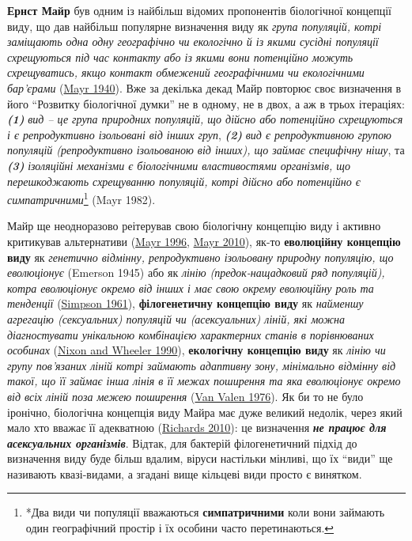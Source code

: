 \documentclass[
  11pt,
]{book}
\begin{document}
\textbf{Ернст Майр} був одним із найбільш відомих пропонентів біологічної концепції виду, що дав найбільш популярне визначення виду як \emph{група популяцій, котрі заміщають одна одну географічно чи екологічно й із якими сусідні популяції схрещуються під час контакту або із якими вони потенційно можуть схрещуватись, якщо контакт обмежений географічними чи екологічними бар'єрами} (\href{https://doi.org/10.1086/280892}{Mayr 1940}). Вже за декілька декад Майр повторює своє визначення в його ``Розвитку біологічної думки'' не в одному, не в двох, а аж в трьох ітераціях: \textbf{\emph{(1)}} \emph{вид -- це група природних популяцій, що дійсно або потенційно схрещуються і є репродуктивно ізольовані від інших груп}, \textbf{\emph{(2)}} \emph{вид є репродуктивною групою популяцій (репродуктивно ізольованою від інших), що займає специфічну нішу}, та \textbf{\emph{(3)}} \emph{ізоляційні механізми є біологічними властивостями організмів, що перешкоджають схрещуванню популяцій, котрі дійсно або потенційно є симпатричними}\footnote{*Два види чи популяції вважаються \textbf{симпатричними} коли вони займають один географічний простір і їх особини часто перетинаються.} (Mayr 1982).

Майр ще неодноразово реітерував свою біологічну концепцію виду і активно критикував альтернативи (\href{https://doi.org/10.1086/289912}{Mayr 1996}, \href{https://doi.org/10.1017/CBO9780511617188}{Mayr 2010}), як-то \textbf{еволюційну концепцію виду} як \emph{генетично відмінну, репродуктивно ізольовану природну популяцію, що еволюціонує} (Emerson 1945) або як \emph{лінію (предок-нащадковий ряд популяцій), котра еволюціонує окремо від інших і має свою окрему еволюційну роль та тенденції} (\href{https://doi.org/10.7312/simp92414}{Simpson 1961}), \textbf{філогенетичну концепцію виду} як \emph{найменшу агрегацію (сексуальних) популяцій чи (асексуальних) ліній, які можна діагностувати унікальною комбінацією характерних станів в порівнюваних особинах} (\href{https://doi.org/10.1111/j.1096-0031.1990.tb00541.x}{Nixon and Wheeler 1990}), \textbf{екологічну концепцію виду} як \emph{лінію чи групу пов'язаних ліній котрі займають адаптивну зону, мінімально відмінну від такої, що її займає інша лінія в її межах поширення та яка еволюціонує окремо від всіх ліній поза межею поширення} (\href{https://doi.org/10.2307/1219444}{Van Valen 1976}). Як би то не було іронічно, біологічна концепція виду Майра має дуже великий недолік, через який мало хто вважає її адекватною (\href{https://doi.org/10.1017/CBO9780511762222}{Richards 2010}): це визначення \textbf{\emph{не працює для асексуальних організмів}}. Відтак, для бактерій філогенетичний підхід до визначення виду буде більш вдалим, віруси настільки мінливі, що їх ``види'' ще називають квазі-видами, а згадані вище кільцеві види просто є винятком.
\end{document}
